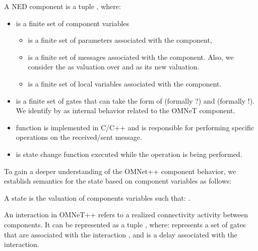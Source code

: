 \begin{mydef} \label{def:omnetcomponent} \normalfont A NED component  is a tuple , where: 
 \begin{itemize}
\item {}  is a finite set of component variables  
 \begin{itemize}
\item  {} is a finite set of parameters associated with the component,
\item {} is a finite set of messages associated with the component. Also, we consider the  as valuation over  and  as its new valuation.
\item {} is a finite set of local variables associated with the component.
\end{itemize}
\item {} is a finite set of gates that can take the form of  (formally ?) and  (formally !). We identify by \emath{\tau} as internal behavior related to the OMNeT component.
\item {} function is implemented in C/C++ and is responsible for performing specific operations on the received/sent message.
\item {} is state change function executed while the operation  is being performed.
\end{itemize}
\end{mydef}

To gain a deeper understanding of the OMNet++ component behavior, we establish semantics for the   state based on component variables as follows: 

\begin{mydef} A  state is the valuation  of   components variables such that: .

\end{mydef}

\begin{mydef}[Interaction] An interaction in OMNeT++ refers to a realized connectivity activity between components. It can be represented as a tuple  , where:      represents a set of gates that are associated with the interaction , and  is a delay associated with the interaction.
\end{mydef}




